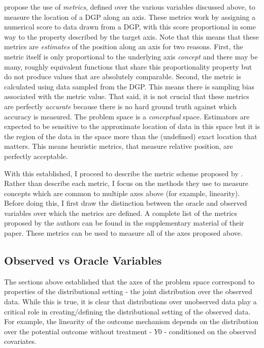 \documentclass[../main.tex]{subfiles}
\begin{document}
\textcite{Dorie2019Automated1} propose the use of \textit{metrics}, defined over the various variables discussed above, to measure the location of a DGP along an axis. These metrics work by assigning a numerical score to data drawn from a DGP, with this score proportional in some way to the property described by the target axis. Note that this means that these metrics are \textit{estimates} of the position along an axis for two reasons. First, the metric itself is only proportional to the underlying axis \textit{concept} and there may be many, roughly equivalent functions that share this proportionality property but do not produce values that are  absolutely comparable. Second, the metric is calculated using data sampled from the DGP. This means there is sampling bias associated with the metric value. That said, it is not crucial that these metrics are perfectly \textit{accurate} because there is no hard ground truth against which accuracy is measured. The problem space is a \textit{conceptual} space. Estimators are expected to be sensitive to the approximate location of data in this space but it is the region of the data in the space more than the (undefined) exact location that matters. This means heuristic metrics, that measure relative position, are perfectly acceptable.

\vspace{\baselineskip}

With this established, I proceed to describe the metric scheme proposed by \textcite{Dorie2019Automated1}. Rather than describe each metric, I focus on the methods they use to measure concepts which are common to multiple axes above (for example, linearity). Before doing this, I first draw the distinction between the oracle and observed variables over which the metrics are defined. A complete list of the metrics proposed by the authors can be found in the supplementary material of their paper. These metrics can be used to measure all of the axes proposed above.

\subsection{Observed vs Oracle Variables}

The sections above established that the axes of the problem space correspond to properties of the distributional setting - the joint distribution over the observed data. While this is true, it is clear that distributions over unobserved data play a critical role in creating/defining the distributional setting of the observed data. For example, the linearity of the outcome mechanism depends on the distribution over the potential outcome without treatment - $Y0$ - conditioned on the observed covariates.
\end{document}
